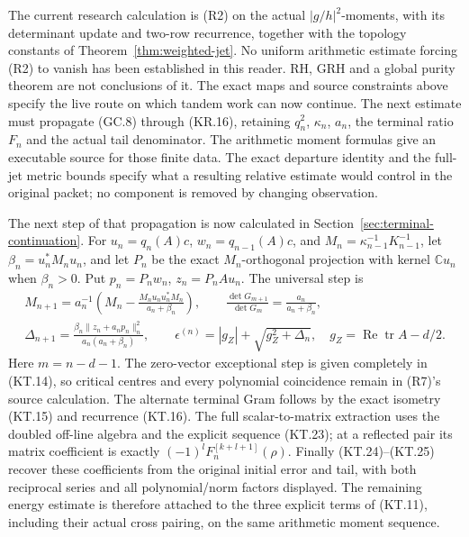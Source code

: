 The current research calculation is (R2) on the actual
\(|g/h|^2\)-moments, with its determinant update and two-row
recurrence, together with the topology constants of
Theorem~\ref{thm:weighted-jet}. No uniform arithmetic estimate
forcing (R2) to vanish has been established in this reader.
RH, GRH and a global purity theorem are not conclusions of it.
The exact maps and source constraints above specify the live
route on which tandem work can now continue.
The next estimate must propagate (GC.8) through (KR.16), retaining
\(q_n^2\), \(\kappa_n\), \(a_n\), the terminal ratio \(F_n\)
and the actual tail denominator. The arithmetic moment formulas
give an executable source for those finite data. The exact
departure identity and the full-jet metric bounds specify what
a resulting relative estimate would control in the original
packet; no component is removed by changing observation.

The next step of that propagation is now calculated in
Section~\ref{sec:terminal-continuation}.  For
\(u_n=q_n(A)c\), \(w_n=q_{n-1}(A)c\), and
\(M_n=\kappa_{n-1}^{-1}K_{n-1}^{-1}\), let
\(\beta_n=u_n^*M_nu_n\), and let \(P_n\) be the exact
\(M_n\)-orthogonal projection with kernel \(\mathbb Cu_n\)
when \(\beta_n>0\).  Put
\(p_n=P_nw_n\), \(z_n=P_nAu_n\).  The universal step is
\[
 \begin{gathered}
 M_{n+1}=a_n^{-1}\left(M_n-
      \frac{M_nu_nu_n^*M_n}{a_n+\beta_n}\right),\qquad
 \frac{\det G_{m+1}}{\det G_m}
             =\frac{a_n}{a_n+\beta_n},\\
 \Delta_{n+1}=
 \frac{\beta_n\|z_n+a_np_n\|_n^2}{a_n(a_n+\beta_n)},\qquad
 \epsilon^{(n)}=|g_Z|+\sqrt{g_Z^2+\Delta_n},\quad
 g_Z=\operatorname{Re}\operatorname{tr}A-d/2.
 \end{gathered}
 \tag{R7}
\]
Here \(m=n-d-1\).  The zero-vector exceptional step is given
completely in (KT.14), so critical centres and every polynomial
coincidence remain in (R7)'s source calculation.  The alternate
terminal Gram follows by the exact isometry (KT.15) and recurrence
(KT.16).  The full scalar-to-matrix extraction uses the doubled
off-line algebra and the explicit sequence (KT.23); at a reflected
pair its matrix coefficient is exactly
\((-1)^lF_n^{[k+l+1]}(\rho)\).  Finally (KT.24)--(KT.25)
recover these coefficients from the original initial error and
tail, with both reciprocal series and all polynomial/norm factors
displayed.  The remaining energy estimate is therefore attached to
the three explicit terms of (KT.11), including their actual cross
pairing, on the same arithmetic moment sequence.

